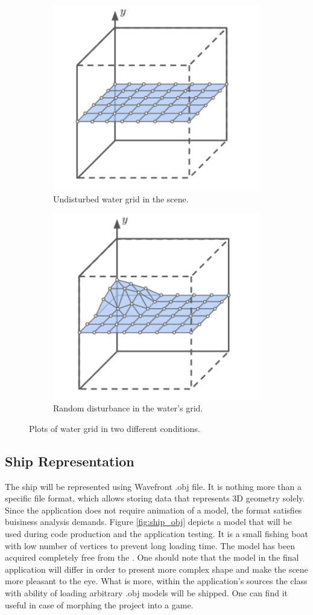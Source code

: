 \documentclass{report}
\begin{document}
\begin{figure}[H]
\begin{subfigure}{.5\textwidth}
  \centering
  \includegraphics[width=.6\linewidth]{images/water_grid_stable.pdf}
  \caption{Undisturbed water grid in the scene.}
  \label{fig:sfig1}
\end{subfigure}%
\begin{subfigure}{.5\textwidth}
  \centering
  \includegraphics[width=.6\linewidth]{images/water_grid_disturbed.pdf}
  \caption{Random disturbance in the water's grid.}
  \label{fig:sfig2}
\end{subfigure}
\caption{Plots of water grid in two different conditions.}
\label{fig:water_deform}
\end{figure}

\subsection{Ship Representation} \label{subsec:ship_repr}
The ship will be represented using Wavefront .obj file. It is nothing more than a specific file format, which allows storing data that represents 3D geometry solely. Since the application does not require animation of a model, the format satisfies buisiness analysis demands. Figure \ref{fig:ship_obj} depicts a model that will be used during code production and the application testing. It is a small fishing boat with low number of vertices to prevent long loading time. The model has been acquired completely free from the \cite{boat_source}. One should note that the model in the final application will differ in order to present more complex shape and make the scene more pleasant to the eye. What is more, within the application's sources the class with ability of loading arbitrary .obj models will be shipped. One can find it useful in case of morphing the project into a game.
\end{document}
